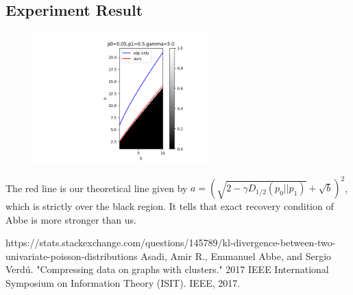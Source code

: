\documentclass{article}
\begin{document}
\subsection{Experiment Result}
\begin{figure}
    \centering
    \includegraphics[width=0.6\textwidth]{fig.png}
    \label{fig:my_label}
\end{figure}

The red line is our theoretical line
given by $a=(\sqrt{2 - \gamma D_{1/2}(p_0||p_1)} + \sqrt{b})^2$,
which is strictly over the black region. It tells that
exact recovery condition of Abbe is more stronger than us.

\begin{thebibliography}{9}
 https://stats.stackexchange.com/questions/145789/kl-divergence-between-two-univariate-poisson-distributions
 Asadi, Amir R., Emmanuel Abbe, and Sergio Verdú. "Compressing data on graphs with clusters." 2017 IEEE International Symposium on Information Theory (ISIT). IEEE, 2017.
\end{thebibliography}
\end{document}
